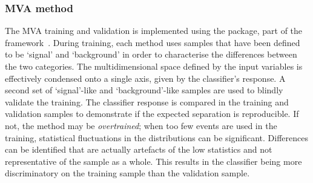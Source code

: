 
\subsubsection{MVA method}
\label{sec:mvamethod}

The MVA training and validation is implemented using the \tmva package, part of the \root framework~\cite{BRUN199781}.
During training, each method uses samples that have been defined to be `signal' and `background' in order to characterise the differences between the two categories. The multidimensional space defined by the input variables is effectively condensed onto a single axis, given by the classifier's response. 
A second set of `signal'-like and `background'-like samples are used to blindly validate the training. 
The classifier response is compared in the training and validation samples to demonstrate if the expected separation is reproducible. If not, the method may be \emph{overtrained}; when too few events are used in the training, statistical fluctuations in the distributions can be significant. Differences can be identified that are actually artefacts of the low statistics and not representative of the sample as a whole. This results in the classifier being more discriminatory on the training sample than the validation sample.



